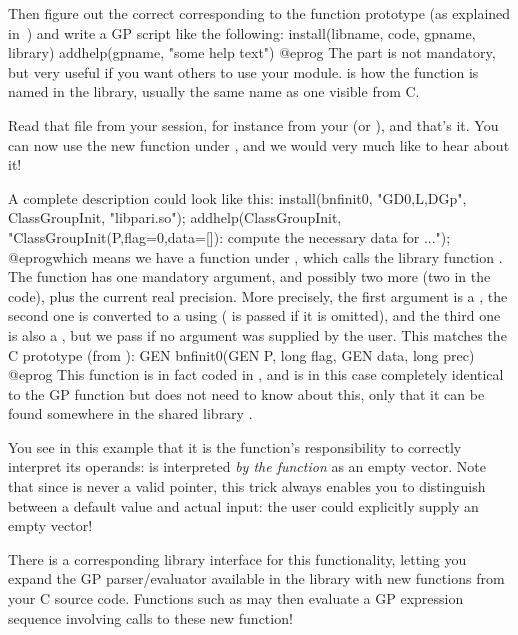 Then figure out the correct  corresponding to the function
prototype (as explained in~) and write a GP script
like the following:
\bprog
install(libname, code, gpname, library)
addhelp(gpname, "some help text")
@eprog
\noindent The  part is not mandatory, but very useful if you
want others to use your module.  is how the function is named in
the library, usually the same name as one visible from C.

Read that file from your  session, for instance from your
 (or ), and that's it. You
can now use the new function  under , and we would very
much like to hear about it!
\smallskip

A complete description could look like this:
\bprog
{
  install(bnfinit0, "GD0,L,DGp", ClassGroupInit, "libpari.so");
  addhelp(ClassGroupInit, "ClassGroupInit(P,{flag=0},{data=[]}):
    compute the necessary data for ...");
}
@eprog\noindent which means we have a function  under
, which calls the library function  . The function has
one mandatory argument, and possibly two more (two  in the code),
plus the current real precision. More precisely, the first argument is a
, the second one is converted to a  using 
( is passed if it is omitted), and the third one is also a ,
but we pass  if no argument was supplied by the user. This matches
the C prototype (from ):
%
\bprog
  GEN bnfinit0(GEN P, long flag, GEN data, long prec)
@eprog\noindent
This function is in fact coded in , and is in this case
completely identical to the GP function  but  does not
need to know about this, only that it can be found somewhere in the shared
library .

 You see in this example that it is the
function's responsibility to correctly interpret its operands:  is interpreted \emph{by the function} as an empty vector. Note that
since  is never a valid  pointer, this trick always
enables you to distinguish between a default value and actual input: the
user could explicitly supply an empty vector!


There is a corresponding library interface for this 
functionality, letting you expand the GP parser/evaluator available in the
library with new functions from your C source code. Functions such as
 may then evaluate a GP expression sequence involving calls
to these new function!

